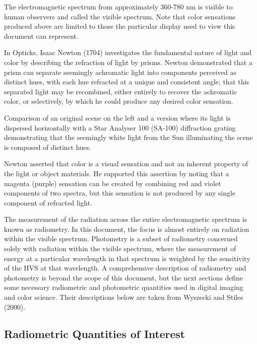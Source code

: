 The electromagnetic spectrum from approximately 360-780 nm is visible to human observers and called the visible spectrum. Note that color sensations produced above are limited to those the particular display used to view this document can represent.

In Opticks, Isaac Newton (1704) investigates the fundamental nature of light and color by describing the refraction of light by prisms. Newton demonstrated that a prism can separate seemingly achromatic light into components perceived as distinct hues, with each hue refracted at a unique and consistent angle; that this separated light may be recombined, either entirely to recover the achromatic color, or selectively, by which he could produce any desired color sensation.

Comparison of an original scene on the left and a version where its light is dispersed horizontally with a Star Analyser 100 (SA-100) diffraction grating demonstrating that the seemingly white light from the Sun illuminating the scene is composed of distinct hues.

Newton asserted that color is a visual sensation and not an inherent property of the light or object materials. He supported this assertion by noting that a magenta (purple) sensation can be created by combining red and violet components of two spectra, but this sensation is not produced by any single component of refracted light.

The measurement of the radiation across the entire electromagnetic spectrum is known as radiometry. In this document, the focus is almost entirely on radiation within the visible spectrum. Photometry is a subset of radiometry concerned solely with radiation within the visible spectrum, where the measurement of energy at a particular wavelength in that spectrum is weighted by the sensitivity of the HVS at that wavelength. A comprehensive description of radiometry and photometry is beyond the scope of this document, but the next sections define some necessary radiometric and photometric quantities used in digital imaging and color science. Their descriptions below are taken from Wyszecki and Stiles (2000).

\subsection{Radiometric Quantities of Interest}

